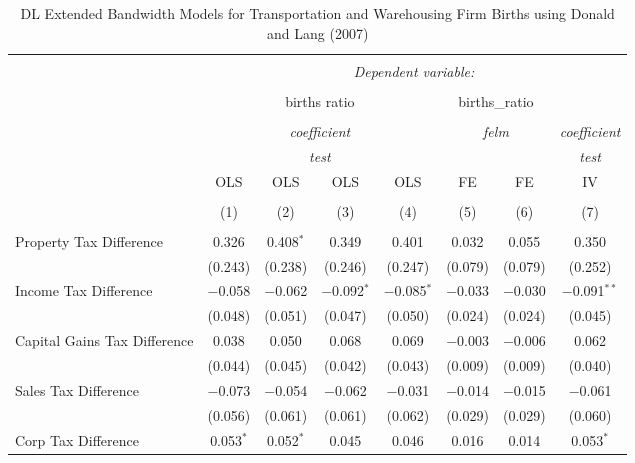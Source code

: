 
\begin{table}[!htbp] \centering 
  \caption{DL Extended Bandwidth Models for  Transportation and Warehousing Firm Births using Donald and Lang (2007)} 
  \label{} 
\begin{tabular}{@{\extracolsep{5pt}}lccccccc} 
\\[-1.8ex]\hline 
\hline \\[-1.8ex] 
 & \multicolumn{7}{c}{\textit{Dependent variable:}} \\ 
\cline{2-8} 
\\[-1.8ex] & \multicolumn{4}{c}{births ratio} & \multicolumn{2}{c}{births\_ratio} &   \\ 
\\[-1.8ex] & \multicolumn{4}{c}{\textit{coefficient}} & \multicolumn{2}{c}{\textit{felm}} & \textit{coefficient} \\ 
 & \multicolumn{4}{c}{\textit{test}} & \multicolumn{2}{c}{\textit{}} & \textit{test} \\ 
 & OLS & OLS & OLS & OLS & FE & FE & IV \\ 
\\[-1.8ex] & (1) & (2) & (3) & (4) & (5) & (6) & (7)\\ 
\hline \\[-1.8ex] 
 Property Tax Difference & 0.326 & 0.408$^{*}$ & 0.349 & 0.401 & 0.032 & 0.055 & 0.350 \\ 
  & (0.243) & (0.238) & (0.246) & (0.247) & (0.079) & (0.079) & (0.252) \\ 
  Income Tax Difference & $-$0.058 & $-$0.062 & $-$0.092$^{*}$ & $-$0.085$^{*}$ & $-$0.033 & $-$0.030 & $-$0.091$^{**}$ \\ 
  & (0.048) & (0.051) & (0.047) & (0.050) & (0.024) & (0.024) & (0.045) \\ 
  Capital Gains Tax Difference & 0.038 & 0.050 & 0.068 & 0.069 & $-$0.003 & $-$0.006 & 0.062 \\ 
  & (0.044) & (0.045) & (0.042) & (0.043) & (0.009) & (0.009) & (0.040) \\ 
  Sales Tax Difference & $-$0.073 & $-$0.054 & $-$0.062 & $-$0.031 & $-$0.014 & $-$0.015 & $-$0.061 \\ 
  & (0.056) & (0.061) & (0.061) & (0.062) & (0.029) & (0.029) & (0.060) \\ 
  Corp Tax Difference & 0.053$^{*}$ & 0.052$^{*}$ & 0.045 & 0.046 & 0.016 & 0.014 & 0.053$^{*}$ \\ 

\end{tabular}
\end{table}
